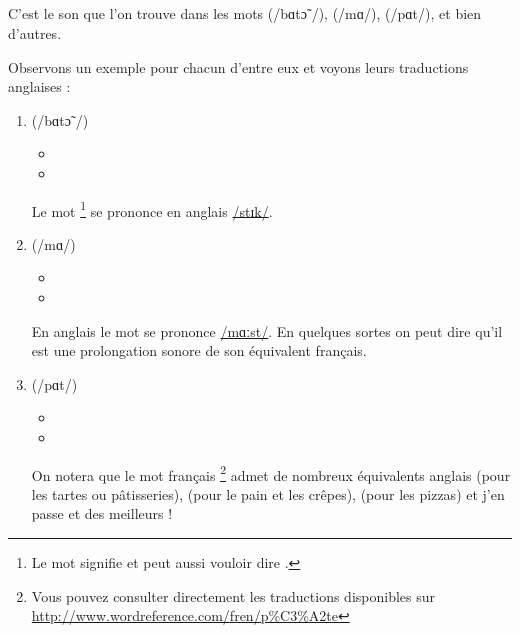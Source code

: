 \subsection{}\label{subsec:ɑfr}

C'est le son que l'on trouve dans les mots  (/bɑtɔ̃ /),
 (/mɑ/),  (/pɑt/), et bien d'autres.

Observons un exemple pour chacun d'entre eux et voyons leurs
traductions anglaises :\par

\begin{enumerate}
\item {} (/bɑtɔ̃ /)
  \begin{itemize}
  \item {}
    \item {}
    \end{itemize}
    Le mot \footnote{Le mot  signifie  et
      peut aussi vouloir dire .} se prononce en anglais \href{https://en.oxforddictionaries.com/definition/stick}{/stɪk/}.
\item {} (/mɑ/)
  \begin{itemize}
  \item {}
  \item {}
  \end{itemize}
  En anglais le mot  se prononce
  \href{https://en.oxforddictionaries.com/definition/mast}{/mɑːst/}. En
  quelques sortes on peut dire qu'il est une prolongation sonore de son
  équivalent français.

  \item {} (/pɑt/)
    \begin{itemize}
    \item {}
    \item {}
    \end{itemize}
    On notera que le mot français \footnote{Vous pouvez consulter
      directement les traductions disponibles sur \url{http://www.wordreference.com/fren/p\%C3\%A2te}} admet de nombreux
    équivalents anglais  (pour les tartes ou
    pâtisseries),  (pour le pain et les crêpes),
     (pour les pizzas) et j'en passe et des meilleurs ! 
\end{enumerate}

